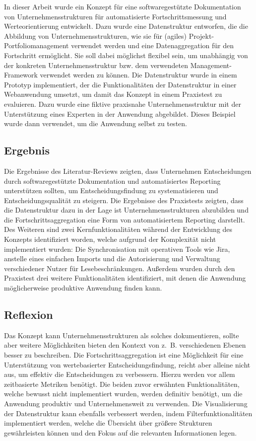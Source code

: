 In dieser Arbeit wurde ein Konzept für eine softwaregestützte Dokumentation von Unternehmensstrukturen für automatisierte Fortschrittsmessung und Werteorientierung entwickelt. Dazu wurde eine Datenstruktur entworfen, die die Abbildung von Unternehmensstrukturen, wie sie für (agiles) Projekt-Portfoliomanagement verwendet werden und eine Datenaggregation für den Fortschritt ermöglicht. Sie soll dabei möglichst flexibel sein, um unabhängig von der konkreten Unternehmensstruktur bzw. dem verwendeten Management-Framework verwendet werden zu können. Die Datenstruktur wurde in einem Prototyp implementiert, der die Funktionalitäten der Datenstruktur in einer Webanwendung umsetzt, um damit das Konzept in einem Praxistest zu evaluieren. Dazu wurde eine fiktive praxisnahe Unternehmensstruktur mit der Unterstützung eines Experten in der Anwendung abgebildet. Dieses Beispiel wurde dann verwendet, um die Anwendung selbst zu testen.

\subsection{Ergebnis}
Die Ergebnisse des Literatur-Reviews zeigten, dass Unternehmen Entscheidungen durch softwaregestützte Dokumentation und automatisiertes Reporting unterstützen sollten, um Entscheidungsfindung zu systematisieren und Entscheidungsqualität zu steigern. Die Ergebnisse des Praxistests zeigten, dass die Datenstruktur dazu in der Lage ist Unternehmensstrukturen abzubilden und die Fortschrittsaggregation eine Form von automatisiertem Reporting darstellt. Des Weiteren sind zwei Kernfunktionalitäten während der Entwicklung des Konzepts identifiziert worden, welche aufgrund der Komplexität nicht implementiert wurden: Die Synchronisation mit operativen Tools wie Jira, anstelle eines einfachen Imports und die Autorisierung und Verwaltung verschiedener Nutzer für Lesebeschränkungen. Außerdem wurden durch den Praxistest drei weitere Funktionalitäten identifiziert, mit denen die Anwendung möglicherweise produktive Anwendung finden kann.

\subsection{Reflexion}
Das Konzept kann Unternehmensstrukturen als solches dokumentieren, sollte aber weitere Möglichkeiten bieten den Kontext von z. B. verschiedenen Ebenen besser zu beschreiben. Die Fortschrittsaggregation ist eine Möglichkeit für eine Unterstützung von wertebasierter Entscheidungsfindung, reicht aber alleine nicht aus, um effektiv die Entscheidungen zu verbessern. Hierzu werden vor allem zeitbasierte Metriken benötigt. Die beiden zuvor erwähnten Funktionalitäten, welche bewusst nicht implementiert wurden, werden definitiv benötigt, um die Anwendung produktiv und Unternehmensweit zu verwenden. Die Visualisierung der Datenstruktur kann ebenfalls verbessert werden, indem Filterfunktionalitäten implementiert werden, welche die Übersicht über größere Strukturen gewährleisten können und den Fokus auf die relevanten Informationen legen.

